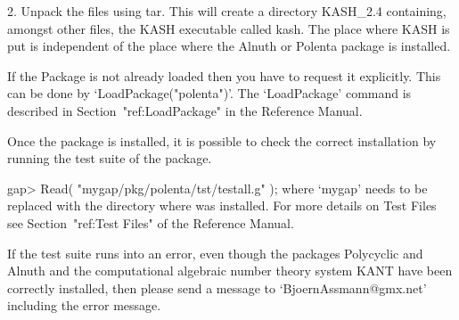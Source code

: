 \item{2.} Unpack the files using tar.  This will create a directory
    KASH_2.4 containing, amongst other files, the KASH executable called
    kash.  The place where KASH is put is independent of the place
    where the Alnuth or Polenta package is installed.
    
\endlist
                                                                               


\null

If the {\Polenta} Package is not already loaded 
then you have to request it explicitly. 
This  can be 
done by `LoadPackage("polenta")'.
The `LoadPackage' command is described in Section~"ref:LoadPackage"
in the {\GAP} Reference Manual.


    Once the package is installed, it is possible to check the correct
    installation by running the test suite of the package.

\beginexample
    gap> Read( "mygap/pkg/polenta/tst/testall.g" );
\endexample
    where `mygap' needs to be replaced with the directory where {\GAP}
    was installed. For more details on  Test Files see 
    Section~"ref:Test Files" of the 
    {\GAP} Reference Manual.

    If the test suite runs into an error, even though the packages
    Polycyclic and 
    Alnuth  and  the computational algebraic number theory system KANT
    have been correctly installed, then please send a message
    to `BjoernAssmann@gmx.net' including the error message.



